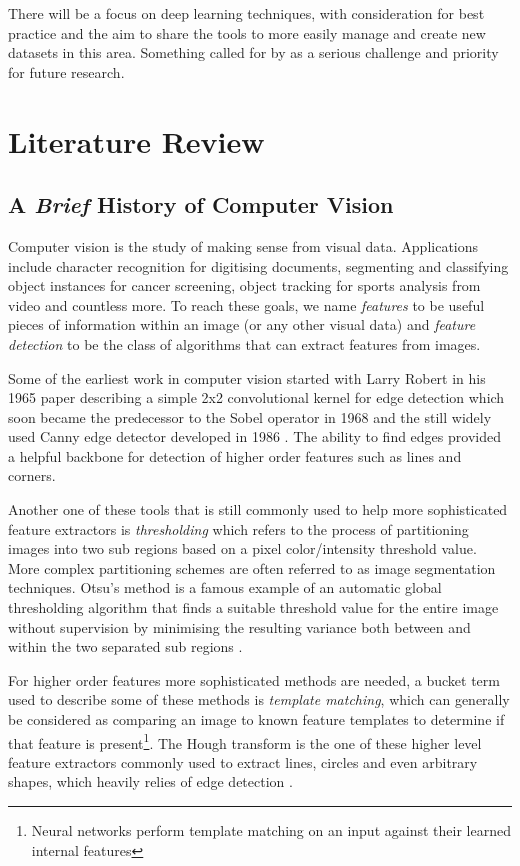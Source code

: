 There will be a focus on deep learning techniques, with consideration for best practice and the aim to share the 
tools to more easily manage and create new datasets in this area.  Something 
called for by \cite{Ding2016ChessVisionC} as a serious challenge and priority for future research.


\section{Literature Review}
\label{research}


\subsection{A \textit{Brief} History of Computer Vision}
\label{a breif history}
Computer vision is the study of making sense from visual data.  Applications include character recognition for digitising documents, segmenting and classifying 
object instances for cancer screening, object tracking for sports analysis from video and countless more. 
To reach these goals, we name \textit{features} to be useful pieces of information within an image (or any other visual data) and \textit{feature detection} to be
the class of algorithms that can extract features from images.

Some of the earliest work in computer vision started with Larry Robert in his 1965 paper \cite{} describing a simple 2x2 convolutional
kernel for edge detection which soon became the predecessor to the Sobel operator in 1968 \cite{} and the still widely used
Canny edge detector developed in 1986 \cite{}. The ability to find edges provided a helpful backbone for detection of higher order features such as lines and corners. 

Another one of these tools that is still commonly used to help more sophisticated feature extractors is \textit{thresholding} which refers to the process of 
partitioning images into two sub regions based on a pixel color/intensity threshold value.  
More complex partitioning schemes are often referred to as image segmentation techniques.
Otsu's method is a famous example of an automatic global thresholding algorithm that finds a suitable threshold value for the entire image without supervision
by minimising the resulting variance both between and within the two separated sub regions \cite{}.

For higher order features more sophisticated methods are needed, a bucket term used to describe some of these methods is \textit{template matching}, which can generally be 
considered as comparing an image to known feature templates to determine if that feature is present\footnote{Neural networks perform template matching 
on an input against their learned internal features}.  The Hough transform is the one of these higher level feature extractors commonly used to extract lines, circles 
and even arbitrary shapes, which heavily relies of edge detection \cite{houghtransform}.

